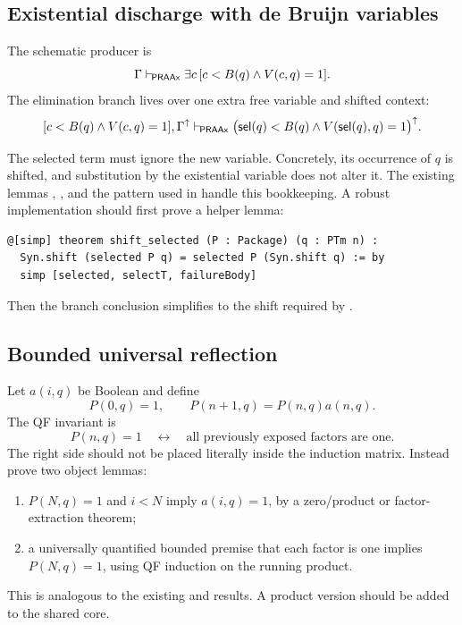 \subsection{Existential discharge with de Bruijn variables}

The schematic producer is
\[
 \Gamma\mathrel{\vdash_{\!\mathsf{PRAAx}}}
 \exists c\,[c<B(q)\wedge V(c,q)=1].
\]
The elimination branch lives over one extra free variable and shifted context:
\[
 [c<B(q)\wedge V(c,q)=1],\Gamma^{\uparrow}
 \mathrel{\vdash_{\!\mathsf{PRAAx}}}
 \bigl(\mathsf{sel}(q)<B(q)\wedge V(\mathsf{sel}(q),q)=1\bigr)^{\uparrow}.
\]

The selected term must ignore the new variable.  Concretely, its occurrence of
\(q\) is shifted, and substitution by the existential variable does not alter
it.  The existing lemmas ,
, and the pattern used in
 handle this bookkeeping.  A robust implementation
should first prove a helper lemma:

\begin{lstlisting}[language=Lean]
@[simp] theorem shift_selected (P : Package) (q : PTm n) :
  Syn.shift (selected P q) = selected P (Syn.shift q) := by
  simp [selected, selectT, failureBody]
\end{lstlisting}

Then the branch conclusion simplifies to the shift required by
.

\subsection{Bounded universal reflection}

Let \(a(i,q)\) be Boolean and define
\[
 P(0,q)=1,
 \qquad
 P(n+1,q)=P(n,q)a(n,q).
\]
The QF invariant is
\[
 P(n,q)=1\quad\leftrightarrow\quad
 \text{all previously exposed factors are one}.
\]
The right side should not be placed literally inside the induction matrix.
Instead prove two object lemmas:

\begin{enumerate}
\item \(P(N,q)=1\) and \(i<N\) imply \(a(i,q)=1\), by a zero/product or
factor-extraction theorem;
\item a universally quantified bounded premise that each factor is one implies
\(P(N,q)=1\), using QF induction on the running product.
\end{enumerate}

This is analogous to the existing  and
 results.  A product version should be added to
the shared core.

